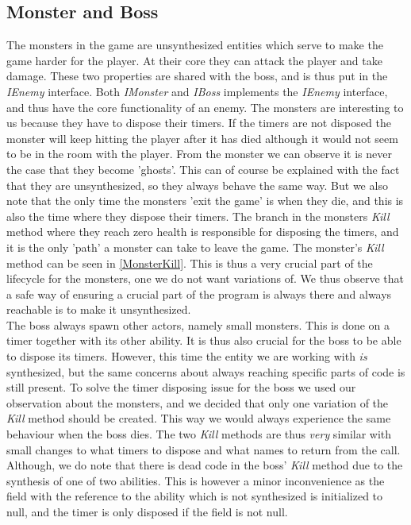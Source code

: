 \subsection{Monster and Boss}
The monsters in the game are unsynthesized entities which serve to make the game harder for the player. At their core they can attack the player and take damage. These two properties are shared with the boss, and is thus put in the \textit{IEnemy} interface. Both \textit{IMonster} and \textit{IBoss} implements the \textit{IEnemy} interface, and thus have the core functionality of an enemy. The monsters are interesting to us because they have to dispose their timers. If the timers are not disposed the monster will keep hitting the player after it has died although it would not seem to be in the room with the player. From the monster we can observe it is never the case that they become 'ghosts'. This can of course be explained with the fact that they are unsynthesized, so they always behave the same way. But we also note that the only time the monsters 'exit the game' is when they die, and this is also the time where they dispose their timers. The branch in the monsters \textit{Kill} method where they reach zero health is responsible for disposing the timers, and it is the only 'path' a monster can take to leave the game. The monster's \textit{Kill} method can be seen in \autoref{MonsterKill}. This is thus a very crucial part of the lifecycle for the monsters, one we do not want variations of. We thus observe that a safe way of ensuring a crucial part of the program is always there and always reachable is to make it unsynthesized.\\
The boss always spawn other actors, namely small monsters. This is done on a timer together with its other ability. It is thus also crucial for the boss to be able to dispose its timers. However, this time the entity we are working with \textit{is} synthesized, but the same concerns about always reaching specific parts of code is still present. To solve the timer disposing issue for the boss we used our observation about the monsters, and we decided that only one variation of the \textit{Kill} method should be created. This way we would always experience the same behaviour when the boss dies. The two \textit{Kill} methods are thus \textit{very} similar with small changes to what timers to dispose and what names to return from the call. Although, we do note that there is dead code in the boss' \textit{Kill} method due to the synthesis of one of two abilities. This is however a minor inconvenience as the field with the reference to the ability which is not synthesized is initialized to null, and the timer is only disposed if the field is not null.
